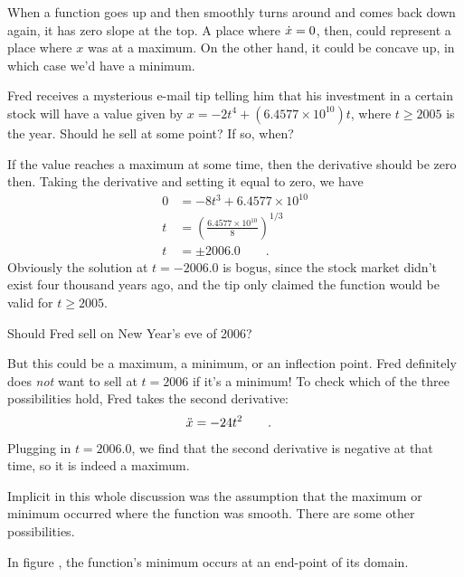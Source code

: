 When a function goes up and then smoothly turns around and comes back down again,
it has zero slope at the top. A place where $\dot{x}=0$, then, could represent
a place where $x$ was at a maximum. On the other hand, it could be concave up,
in which case we'd have a minimum.

\begin{eg}
\egquestion Fred receives a mysterious e-mail tip telling him that his investment in a certain stock will
have a value given by $x=-2t^4+(6.4577\times10^{10})t$, where $t\ge 2005$ is the year. Should he sell at some point? If so, when?

\eganswer If the value reaches a maximum at some time, then the derivative should be zero then. Taking the
derivative and setting it equal to zero, we have
\begin{align*}
  0 &= -8t^3+6.4577\times10^{10}\\
  t &= \left(\frac{6.4577\times10^{10}}{8}\right)^{1/3} \\
  t &= \pm 2006.0 \qquad .
\end{align*}
Obviously the solution at $t=-2006.0$ is bogus, since the stock market didn't exist four thousand years ago, and
the tip only claimed the function would be valid for $t\ge 2005$.

Should Fred sell on New Year's eve of 2006?

But this could be a maximum, a minimum, or an inflection point. Fred definitely does \emph{not} want to
sell at $t=2006$ if it's a minimum! To check which of the three possibilities hold, Fred takes the
second derivative:
\begin{align*}
 \Ddot{x} &= -24t^2 \qquad .
\end{align*}
Plugging in $t=2006.0$, we find that the second derivative is negative at that time, so it is indeed a
maximum.
\end{eg}

Implicit in this whole discussion was the assumption that the maximum or minimum occurred where the function was
smooth. There are some other possibilities.

In figure , the function's minimum occurs at an end-point of its domain.
%
%

